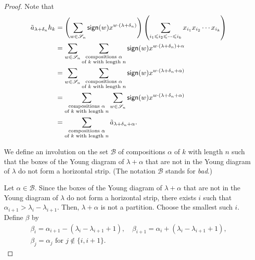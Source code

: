 \begin{proof}
    Note that
    \begin{align}
        \tilde{a}_{\lambda + \delta_n} h_k
        &=
        \left(
            \sum_{w \in \mathscr{S}_{n}} \operatorname{\mathsf{sign}}(w) x^{w \cdot (\lambda + \delta_n)} 
        \right) 
        \left(
            \sum_{i_1 \leqslant i_2 \leqslant \cdots \leqslant i_k} x_{i_1} x_{i_2} \cdots x_{i_k}
        \right) \\
        &=
        \sum_{w \in \mathscr{S}_{n}}
        \sum_{\substack{\text{compositions } \alpha \\ \text{of } k \text{ with length } n}}
        \operatorname{\mathsf{sign}}(w) x^{w \cdot (\lambda + \delta_n) + \alpha} \\
        &=
        \sum_{w \in \mathscr{S}_{n}}
        \sum_{\substack{\text{compositions } \alpha \\ \text{of } k \text{ with length } n}}
        \operatorname{\mathsf{sign}}(w) x^{w \cdot (\lambda + \delta_n + \alpha)} \\
        &=
        \sum_{\substack{\text{compositions } \alpha \\ \text{of } k \text{ with length } n}}
        \sum_{w \in \mathscr{S}_{n}}
        \operatorname{\mathsf{sign}}(w) x^{w \cdot (\lambda + \delta_n + \alpha)} \\
        &=
        \sum_{\substack{\text{compositions } \alpha \\ \text{of } k \text{ with length } n}}
        \tilde{a}_{\lambda + \delta_n + \alpha}.
    \end{align}

    We define an involution on the set \(\mathcal{B}\) of compositions \(\alpha\) of \(k\) with length \(n\) such that the boxes of the Young diagram of \(\lambda + \alpha\) that are not in the Young diagram of \(\lambda\) do not form a horizontal strip.
    (The notation \(\mathcal{B}\) stands for \emph{bad}.)

    Let \(\alpha \in \mathcal{B}\).
    Since the boxes of the Young diagram of \(\lambda + \alpha\) that are not in the Young diagram of \(\lambda\) do not form a horizontal strip,
    there exists \(i\) such that
    \(\alpha_{i+1} > \lambda_i - \lambda_{i+1}\).
    Then, \(\lambda + \alpha\) is not a partition.
    Choose the smallest such \(i\).
    Define \(\beta\) by
    \begin{gather}
        \beta_i = \alpha_{i+1} - (\lambda_i - \lambda_{i+1} + 1), \quad
        \beta_{i+1} = \alpha_i + (\lambda_i - \lambda_{i+1} + 1), \\
        \beta_j = \alpha_j \text{ for } j \notin \{i, i+1\}.
    \end{gather}


\end{proof}

